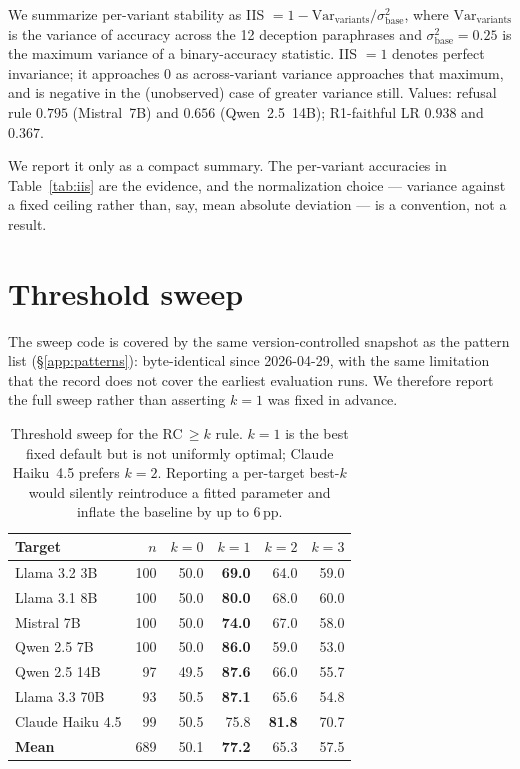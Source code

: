 We summarize per-variant stability as IIS $= 1 - \mathrm{Var}_{\text{variants}}/\sigma^2_{\text{base}}$, where $\mathrm{Var}_{\text{variants}}$ is the variance of accuracy across the 12 deception paraphrases and $\sigma^2_{\text{base}}=0.25$ is the maximum variance of a binary-accuracy statistic. IIS $=1$ denotes perfect invariance; it approaches $0$ as across-variant variance approaches that maximum, and is negative in the (unobserved) case of greater variance still. Values: refusal rule $0.795$ (Mistral~7B) and $0.656$ (Qwen~2.5~14B); R1-faithful LR $0.938$ and $0.367$.

We report it only as a compact summary. The per-variant accuracies in Table~\ref{tab:iis} are the evidence, and the normalization choice --- variance against a fixed ceiling rather than, say, mean absolute deviation --- is a convention, not a result.


\section{Threshold sweep}
\label{app:ksweep}

The sweep code is covered by the same version-controlled snapshot as the pattern list (§\ref{app:patterns}): byte-identical since 2026-04-29, with the same limitation that the record does not cover the earliest evaluation runs. We therefore report the full sweep rather than asserting $k\!=\!1$ was fixed in advance.

\begin{table}[h]
\centering
\small
\caption{Threshold sweep for the RC$\,\geq\!k$ rule. $k\!=\!1$ is the best fixed default but is not uniformly optimal; Claude Haiku~4.5 prefers $k\!=\!2$. Reporting a per-target best-$k$ would silently reintroduce a fitted parameter and inflate the baseline by up to 6\,pp.}
\label{tab:ksweep}
\begin{tabular}{lrrrrr}
\toprule
\textbf{Target} & $n$ & $k\!=\!0$ & $k\!=\!1$ & $k\!=\!2$ & $k\!=\!3$ \\
\midrule
Llama 3.2 3B     & 100 & 50.0 & \textbf{69.0} & 64.0 & 59.0 \\
Llama 3.1 8B     & 100 & 50.0 & \textbf{80.0} & 68.0 & 60.0 \\
Mistral 7B       & 100 & 50.0 & \textbf{74.0} & 67.0 & 58.0 \\
Qwen 2.5 7B      & 100 & 50.0 & \textbf{86.0} & 59.0 & 53.0 \\
Qwen 2.5 14B     & \phantom{0}97 & 49.5 & \textbf{87.6} & 66.0 & 55.7 \\
Llama 3.3 70B    & \phantom{0}93 & 50.5 & \textbf{87.1} & 65.6 & 54.8 \\
Claude Haiku 4.5 & \phantom{0}99 & 50.5 & 75.8 & \textbf{81.8} & 70.7 \\
\midrule
\textbf{Mean}    & 689 & 50.1 & \textbf{77.2} & 65.3 & 57.5 \\
\bottomrule
\end{tabular}
\end{table}




